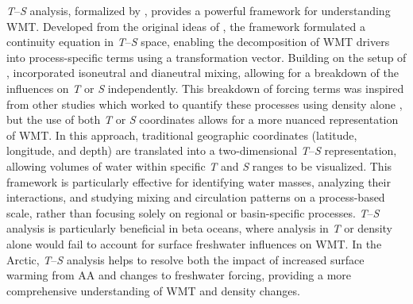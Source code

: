 \documentclass[draft]{agujournal2019}
\begin{document}

\emph{T}--\emph{S} analysis, formalized by , provides a powerful framework for understanding WMT. Developed from the original ideas of , the  framework formulated a continuity equation in \emph{T}--\emph{S} space, enabling the decomposition of WMT drivers into process-specific terms using a transformation vector. Building on the setup of ,  incorporated isoneutral and dianeutral mixing, allowing for a breakdown of the influences on \emph{T} or \emph{S} independently. This breakdown of forcing terms was inspired from other studies which worked to quantify these processes using density alone \cite{Tziperman1986,Nurser1999,Marshall1999,Iudicone2008}, but the use of both \emph{T} or \emph{S} coordinates allows for a more nuanced representation of WMT. In this approach, traditional geographic coordinates (latitude, longitude, and depth) are translated into a two-dimensional \emph{T}--\emph{S} representation, allowing volumes of water within specific \emph{T} and \emph{S} ranges to be visualized. This framework is particularly effective for identifying water masses, analyzing their interactions, and studying mixing and circulation patterns on a process-based scale, rather than focusing solely on regional or basin-specific processes. \emph{T}--\emph{S} analysis is particularly beneficial in beta oceans, where analysis in \emph{T} or density alone would fail to account for surface freshwater influences on WMT. In the Arctic, \emph{T}--\emph{S} analysis helps to resolve both the impact of increased surface warming from AA and changes to freshwater forcing, providing a more comprehensive understanding of WMT and density changes.
\end{document}
